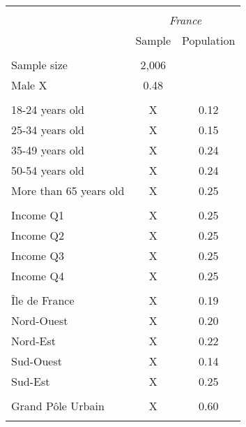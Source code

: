 \begin{tabular}{lcc}
\toprule
\hline \\[-1.8ex]
\multicolumn{1}{c}{\em{ }} & \multicolumn{2}{c}{\em{France}}\\
\cmidrule(l{3pt}r{3pt}){2-3}
\noalign{\smallskip}  & Sample & Population\\
\hline \\[-1.8ex] 
Sample size & 2,006 &  \\
\noalign{\smallskip}\hline \noalign{\smallskip}Male X & 0.48\\ 
\\
18-24 years old & X & 0.12\\
25-34 years old & X & 0.15\\
35-49 years old & X & 0.24\\
50-54 years old & X & 0.24\\
More than 65 years old & X & 0.25\\ 
\\
Income Q1 & X & 0.25\\
Income Q2 & X & 0.25\\
Income Q3 & X & 0.25\\
Income Q4 & X & 0.25\\
\\
Île de France & X & 0.19\\
Nord-Ouest & X & 0.20\\
Nord-Est & X & 0.22\\
Sud-Ouest & X & 0.14\\
Sud-Est & X & 0.25\\
\\
Grand Pôle Urbain & X & 0.60\\
\\
\bottomrule
\end{tabular}